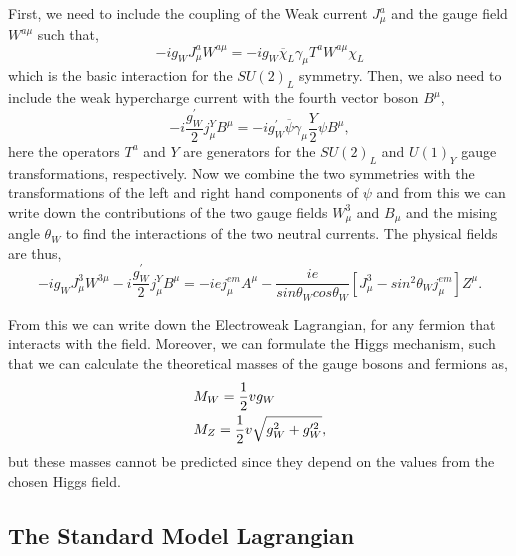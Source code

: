 First, we need to include the coupling of the Weak current $J^a_\mu$ and the gauge field $W^{a\mu}$ such that,
\begin{equation}
-ig_WJ^a_\mu W^{a\mu}=-ig_W\overline{\chi}_L\gamma_\mu T^aW^{a\mu}\chi_L
\end{equation}
which is the basic interaction for the $SU(2)_L$ symmetry. Then, we also need to include the weak hypercharge current with the fourth vector boson $B^\mu$,
\begin{equation}
-i\frac{g_W^{\prime}}{2}j_\mu^YB^\mu=-ig_W^{\prime}\overline{\psi}\gamma_\mu\frac{Y}{2}\psi B^\mu, 
\end{equation}
here the operators $T^a$ and $Y$ are generators for the $SU(2)_L$ and $U(1)_Y$ gauge transformations, respectively. Now we combine the two symmetries with the transformations of the left and right hand components of $\psi$ and from this we can write down the contributions of the two gauge fields $W_\mu^3$ and $B_\mu$ and the mising angle $\theta_W$ to find the interactions of the two neutral currents. The physical fields are thus,
\begin{equation}
-ig_WJ_\mu^3W^{3\mu}-i\frac{g_W^{\prime}}{2}j_\mu^YB^\mu=-iej_\mu^{em}A^\mu-\frac{ie}{sin\theta_Wcos\theta_W}[J_\mu^3-sin^2\theta_Wj_\mu^{em}]Z^\mu.
\end{equation}

From this we can write down the Electroweak Lagrangian, for any fermion that interacts with the field. Moreover, we can formulate the Higgs mechanism, such that we can calculate the theoretical masses of the gauge bosons and fermions as, 
\begin{equation}
\begin{split}
& M_{W}=\frac{1}{2}vg_W \\
& M_{Z}=\frac{1}{2}v\sqrt{g_W^2+g_W^{\prime 2}},
\end{split}
\end{equation}
but these masses cannot be predicted since they depend on the values from the chosen Higgs field. 

\subsection{The Standard Model Lagrangian}

